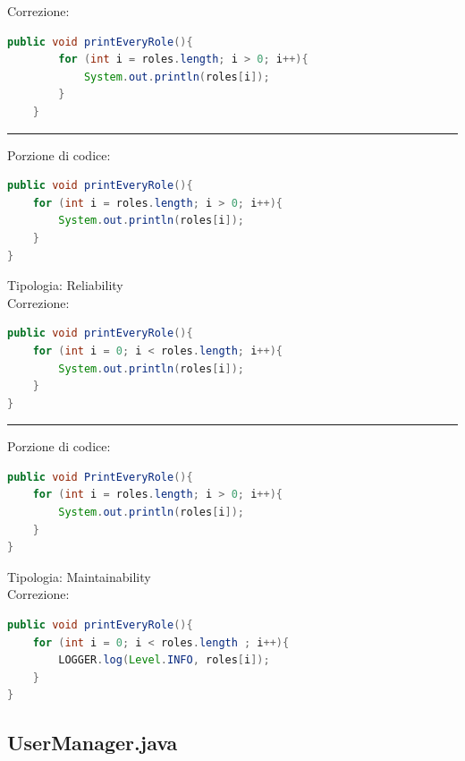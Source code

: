 \documentclass{article}
\begin{document}
Correzione:
\begin{lstlisting}[language=Java]
    public void printEveryRole(){
        for (int i = roles.length; i > 0; i++){
            System.out.println(roles[i]);
        }
    }
\end{lstlisting}
\vspace{.5em}\hrule\vspace{.5em}
Porzione di codice:
\begin{lstlisting}[language=Java]
public void printEveryRole(){
    for (int i = roles.length; i > 0; i++){
        System.out.println(roles[i]);
    }
}
\end{lstlisting}
Tipologia: Reliability\\
Correzione:
\begin{lstlisting}[language=Java]
public void printEveryRole(){
    for (int i = 0; i < roles.length; i++){
        System.out.println(roles[i]);
    }
}
\end{lstlisting}
\vspace{.5em}\hrule\vspace{.5em}
Porzione di codice:
\begin{lstlisting}[language=Java]
public void PrintEveryRole(){
    for (int i = roles.length; i > 0; i++){
        System.out.println(roles[i]);
    }
}
\end{lstlisting}
Tipologia: Maintainability\\
Correzione:
\begin{lstlisting}[language=Java]
public void printEveryRole(){
    for (int i = 0; i < roles.length ; i++){
        LOGGER.log(Level.INFO, roles[i]);
    }
}
\end{lstlisting}
\subsection{UserManager.java}
\end{document}
